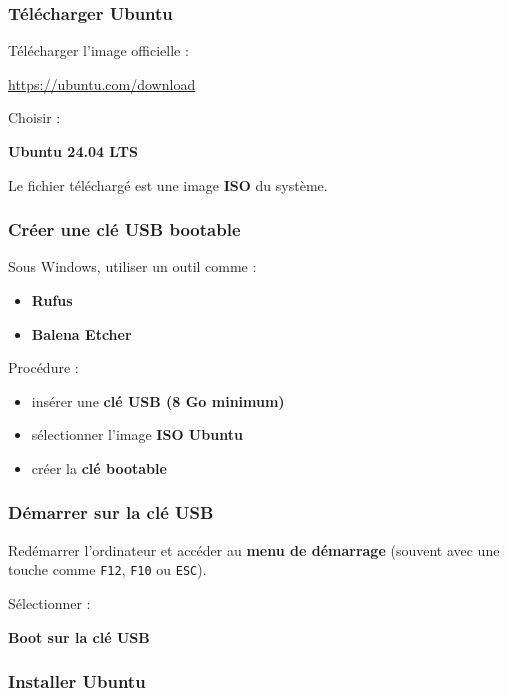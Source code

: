 \documentclass[
  french,
]{article}
\providecommand{\tightlist}{%
  \setlength{\itemsep}{0pt}\setlength{\parskip}{0pt}}
\begin{document}
\subsubsection{Télécharger Ubuntu}\label{tuxe9luxe9charger-ubuntu}

Télécharger l'image officielle :

\url{https://ubuntu.com/download}

Choisir :

\textbf{Ubuntu 24.04 LTS}

Le fichier téléchargé est une image \textbf{ISO} du système.

\subsubsection{Créer une clé USB
bootable}\label{cruxe9er-une-cluxe9-usb-bootable}

Sous Windows, utiliser un outil comme :

\begin{itemize}
\tightlist
\item
  \textbf{Rufus}
\item
  \textbf{Balena Etcher}
\end{itemize}

Procédure :

\begin{itemize}
\tightlist
\item
  insérer une \textbf{clé USB (8 Go minimum)}
\item
  sélectionner l'image \textbf{ISO Ubuntu}
\item
  créer la \textbf{clé bootable}
\end{itemize}

\subsubsection{Démarrer sur la clé
USB}\label{duxe9marrer-sur-la-cluxe9-usb}

Redémarrer l'ordinateur et accéder au \textbf{menu de démarrage}
(souvent avec une touche comme \texttt{F12}, \texttt{F10} ou
\texttt{ESC}).

Sélectionner :

\textbf{Boot sur la clé USB}

\subsubsection{Installer Ubuntu}\label{installer-ubuntu}
\end{document}
